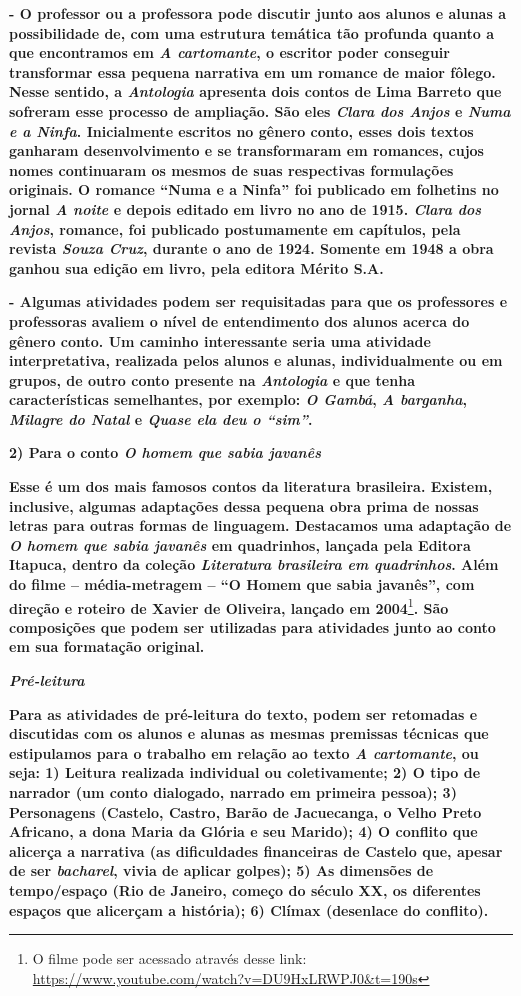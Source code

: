 \textbf{- O professor ou a professora pode discutir junto aos alunos e
alunas a possibilidade de, com uma estrutura temática tão profunda
quanto a que encontramos em \emph{A cartomante}, o escritor poder
conseguir transformar essa pequena narrativa em um romance de maior
fôlego. Nesse sentido, a \emph{Antologia} apresenta dois contos de Lima
Barreto que sofreram esse processo de ampliação. São eles \emph{Clara
dos Anjos} e \emph{Numa e a Ninfa}. Inicialmente escritos no gênero
conto, esses dois textos ganharam desenvolvimento e se transformaram em
romances, cujos nomes continuaram os mesmos de suas respectivas
formulações originais. O romance ``Numa e a Ninfa'' foi publicado em
folhetins no jornal \emph{A noite} e depois editado em livro no ano de
1915. \emph{Clara dos Anjos}, romance, foi publicado postumamente em
capítulos, pela revista \emph{Souza Cruz}, durante o ano de 1924.
Somente em 1948 a obra ganhou sua edição em livro, pela editora Mérito
S.A. }

\textbf{- Algumas atividades podem ser requisitadas para que os
professores e professoras avaliem o nível de entendimento dos alunos
acerca do gênero conto. Um caminho interessante seria uma atividade
interpretativa, realizada pelos alunos e alunas, individualmente ou em
grupos, de outro conto presente na \emph{Antologia} e que tenha
características semelhantes, por exemplo: \emph{O Gambá}, \emph{A
barganha}, \emph{Milagre do Natal} e \emph{Quase ela deu o ``sim''}.}

\textbf{2) Para o conto \emph{O homem que sabia javanês}}

\textbf{Esse é um dos mais famosos contos da literatura brasileira.
Existem, inclusive, algumas adaptações dessa pequena obra prima de
nossas letras para outras formas de linguagem. Destacamos uma adaptação
de \emph{O homem que sabia javanês} em quadrinhos, lançada pela Editora
Itapuca, dentro da coleção \emph{Literatura brasileira em quadrinhos}.
Além do filme -- média-metragem -- ``O Homem que sabia javanês'', com
direção e roteiro de Xavier de Oliveira, lançado em 2004}\footnote{O
  filme pode ser acessado através desse link:
  \url{https://www.youtube.com/watch?v=DU9HxLRWPJ0\&t=190s}}\textbf{.
São composições que podem ser utilizadas para atividades junto ao conto
em sua formatação original.}

\emph{\textbf{Pré-leitura}}

\textbf{Para as atividades de pré-leitura do texto, podem ser retomadas
e discutidas com os alunos e alunas as mesmas premissas técnicas que
estipulamos para o trabalho em relação ao texto \emph{A cartomante}, ou
seja: 1) Leitura realizada individual ou coletivamente; 2) O tipo de
narrador (um conto dialogado, narrado em primeira pessoa); 3)
Personagens (Castelo, Castro, Barão de Jacuecanga, o Velho Preto
Africano, a dona Maria da Glória e seu Marido); 4) O conflito que
alicerça a narrativa (as dificuldades financeiras de Castelo que, apesar
de ser \emph{bacharel}, vivia de aplicar golpes); 5) As dimensões de
tempo/espaço (Rio de Janeiro, começo do século XX, os diferentes espaços
que alicerçam a história); 6) Clímax (desenlace do conflito). }

